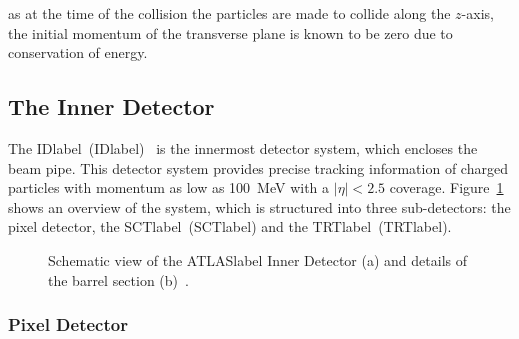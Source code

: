 as at the time of the collision the particles are made to collide along the $z$-axis, the initial momentum of the transverse plane is known to be zero due to conservation of energy.

\subsection{The Inner Detector}

The \acrlong{IDlabel}~(\acrshort{IDlabel})~\cite{CERN-LHCC-97-016,Haywood:331064,Pixelupgrade} is the innermost detector system, which encloses the beam pipe. This detector system provides precise tracking information of charged particles with momentum as low as 100~MeV with a $|\eta|<2.5$ coverage. Figure~\ref{figLHC:ATLASID} shows an overview of the system, which is structured into three sub-detectors: the pixel detector, the \acrlong{SCTlabel}~(\acrshort{SCTlabel}) and the \acrlong{TRTlabel}~(\acrshort{TRTlabel}).

\begin{figure}[htbp]
    \RawFloats
    \begin{center}
    \quad
    \caption{
        Schematic view of the \acrshort{ATLASlabel} Inner Detector (a) and details of the barrel section (b)~\cite{Collaboration_2008}. 
    }
    \label{figLHC:ATLASID}
    \end{center}
\end{figure}

\subsubsection*{Pixel Detector}

